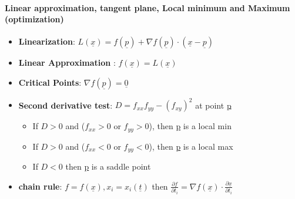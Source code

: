 \documentclass[8pt, twocolumn]{article}
\begin{document}
\paragraph{Linear approximation, tangent plane, Local minimum and Maximum (optimization)}
\begin{itemize}
			\item \textbf{Linearization}: $L(\underline{x}) = f(\underline{p}) + \nabla f(\underline{p}) \cdot (\underline{x} - \underline{p})$
			\item \textbf{Linear Approximation} : $f(\underline{x}) = L(\underline{x})$
			\item \textbf{Critical Points}: $\nabla f(\underline{p})= \underline{0}$
			\item \textbf{Second derivative test}: $D = f_{xx}f_{yy} - (f_{xy})^2$ at point \underline{p} 
				\begin{itemize}
					\item If $D > 0$ and  ($f_{xx} > 0$  or $f_{yy} > 0$), then \underline{p} is a local min
					\item If $D > 0$ and  ($f_{xx} < 0$  or $f_{yy} < 0$), then \underline{p} is a local max
					\item If $D < 0$  then \underline{p} is a saddle point
				\end{itemize} 
			\item \textbf{chain rule}: $f = f(\underline{x}) , x_i = x_i(\underline{t})$ then $\frac{\partial{f}}{\partial{t_i}} = \nabla f(\underline{x}) \cdot  \frac{\partial{\underline{x}}}{\partial{t_i}}$ 


\end{itemize} 
\end{document}
